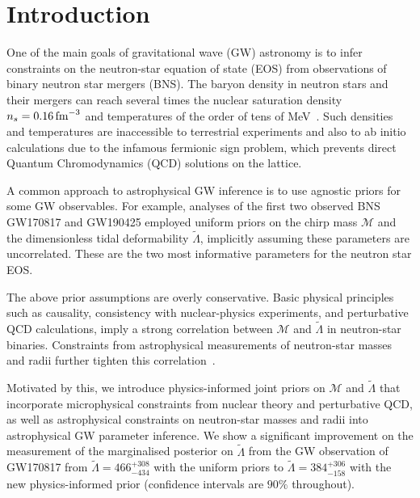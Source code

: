 \documentclass[twocolumn]{aastex631}
\begin{document}
		
\section{Introduction}
\label{sec:Intro}
	
One of the main goals of gravitational wave (GW) astronomy is to infer
constraints on the neutron-star equation of state (EOS) from observations
of binary neutron star mergers (BNS). The baryon density in neutron stars
and their mergers can reach several times the nuclear saturation density
$n_s=0.16\,{\rm fm}^{-3}$ and temperatures of the order of tens of
MeV~\citep[see, e.g.,][for reviews]{Baiotti2016,
  Paschalidis2016,Radice2020b}. Such densities and temperatures are
inaccessible to terrestrial experiments and also to ab initio
calculations due to the infamous fermionic sign problem, which prevents
direct Quantum Chromodynamics (QCD) solutions on the lattice.

A common approach to astrophysical GW inference is to use agnostic priors
for some GW observables. For example, analyses of the first two observed
BNS GW170817 \citep[e.g.,][]{abbott17_170817observation,
  abbott18_170817EOS, abbott19_170817Properties} and GW190425
\citep[e.g.,][]{abbott20_190425} employed uniform priors on the chirp
mass $\mathcal{M}$ and the dimensionless tidal deformability
$\tilde{\Lambda}$, implicitly assuming these parameters are
uncorrelated. These are the two most informative parameters for the
neutron star EOS.

The above prior assumptions are overly conservative. Basic physical
principles such as causality, consistency with nuclear-physics
experiments, and perturbative QCD calculations, imply a strong
correlation between $\mathcal{M}$ and $\tilde{\Lambda}$ in neutron-star
binaries. Constraints from astrophysical measurements of neutron-star
masses and radii further tighten this correlation~\citep{Altiparmak:2022,
  Ecker:2022, Ecker:2022dlg}.

Motivated by this, we introduce physics-informed joint priors on
$\mathcal{M}$ and $\tilde{\Lambda}$ that incorporate microphysical
constraints from nuclear theory and perturbative QCD, as well as
astrophysical constraints on neutron-star masses and radii into
astrophysical GW parameter inference. We show a significant improvement
on the measurement of the marginalised posterior on $\tilde{\Lambda}$
from the GW observation of GW170817 from $\tilde{\Lambda} =
466^{+308}_{-434}$ with the uniform priors to $\tilde{\Lambda} =
384^{+306}_{-158}$ with the new physics-informed prior (confidence
intervals are $90\%$ throughout). 
\end{document}
